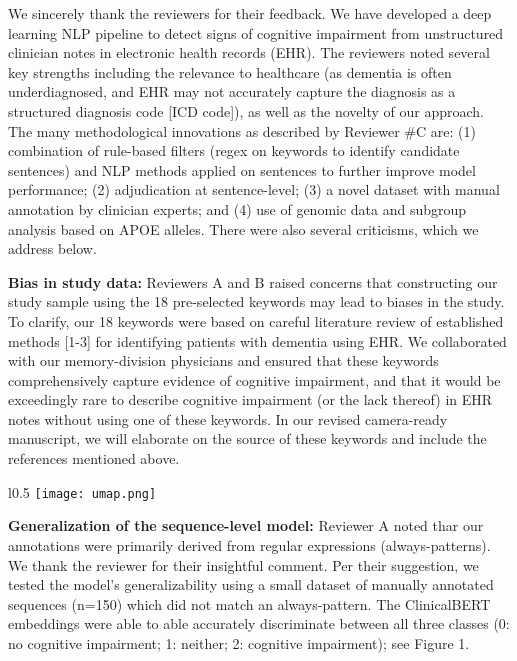 \documentclass{article}
\begin{document}
\pagestyle{fancy}

We sincerely thank the reviewers for their feedback. We have developed a deep learning NLP pipeline to detect signs of cognitive impairment from unstructured clinician notes in electronic health records (EHR). The reviewers noted several key strengths including the relevance to healthcare (as dementia is often underdiagnosed, and EHR may not accurately capture the diagnosis as a structured diagnosis code [ICD code]), as well as the novelty of our approach. The many methodological innovations as described by Reviewer #C are: (1) combination of rule-based filters (regex on keywords to identify candidate sentences) and NLP methods applied on sentences to further improve model performance; (2) adjudication at sentence-level; (3) a novel dataset with manual annotation by clinician experts; and (4) use of genomic data and subgroup analysis based on APOE alleles. There were also several criticisms, which we address below.

\textbf{Bias in study data:} Reviewers A and B raised concerns that constructing our study sample using the 18 pre-selected keywords may lead to biases in the study. To clarify, our 18 keywords were based on careful literature review of established methods [1-3] for identifying patients with dementia using EHR. We collaborated with our memory-division physicians and ensured that these keywords comprehensively capture evidence of cognitive impairment, and that it would be exceedingly rare to describe cognitive impairment (or the lack thereof) in EHR notes without using one of these keywords. In our revised camera-ready manuscript, we will elaborate on the source of these keywords and include the references mentioned above.

\begin{wrapfigure}{l}{0.5\textwidth}
\centering
\texttt{[image: umap.png]}
\caption{}
\end{wrapfigure}

\textbf{Generalization of the sequence-level model:} Reviewer A noted thar our annotations were primarily derived from regular expressions (always-patterns). We thank the reviewer for their insightful comment. Per their suggestion, we tested the model’s generalizability using a small dataset of manually annotated sequences (n=150) which did not match an always-pattern. The ClinicalBERT embeddings were able to able accurately discriminate between all three classes (0: no cognitive impairment; 1: neither; 2: cognitive impairment); see Figure 1.
\end{document}
